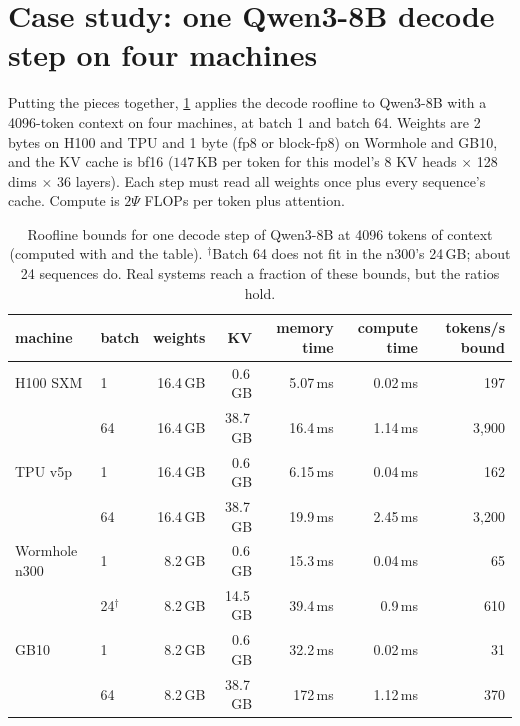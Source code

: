 \section{Case study: one Qwen3-8B decode step on four machines}\label{sec:accel:case}

Putting the pieces together, \cref{tab:accel:case} applies the decode roofline to Qwen3-8B with a
4096-token context on four machines, at batch 1 and batch 64. Weights are 2 bytes on H100 and TPU and
1 byte (fp8 or block-fp8) on Wormhole and GB10, and the KV cache is bf16
($147$\,KB per token for this model's 8 KV heads $\times$ 128 dims $\times$ 36 layers). Each step must
read all weights once plus every sequence's cache. Compute is $2\Psi$ FLOPs per token plus attention.

\begin{table}[t]
\centering\small
\begin{tabular}{llrrrrr}
\toprule
machine & batch & weights & KV & memory time & compute time & tokens/s bound\\
\midrule
H100 SXM & 1 & 16.4\,GB & 0.6\,GB & 5.07\,ms & 0.02\,ms & 197\\
 & 64 & 16.4\,GB & 38.7\,GB & 16.4\,ms & 1.14\,ms & 3{,}900\\
TPU v5p & 1 & 16.4\,GB & 0.6\,GB & 6.15\,ms & 0.04\,ms & 162\\
 & 64 & 16.4\,GB & 38.7\,GB & 19.9\,ms & 2.45\,ms & 3{,}200\\
Wormhole n300 & 1 & 8.2\,GB & 0.6\,GB & 15.3\,ms & 0.04\,ms & 65\\
 & 24$^\dagger$ & 8.2\,GB & 14.5\,GB & 39.4\,ms & 0.9\,ms & 610\\
GB10 & 1 & 8.2\,GB & 0.6\,GB & 32.2\,ms & 0.02\,ms & 31\\
 & 64 & 8.2\,GB & 38.7\,GB & 172\,ms & 1.12\,ms & 370\\
\bottomrule
\end{tabular}
\caption{Roofline bounds for one decode step of Qwen3-8B at 4096 tokens of context (computed with
 and the  table). $^\dagger$Batch 64 does not fit in the
n300's 24\,GB; about 24 sequences do. Real systems reach a fraction of these bounds, but the ratios hold.}
\label{tab:accel:case}
\end{table}

